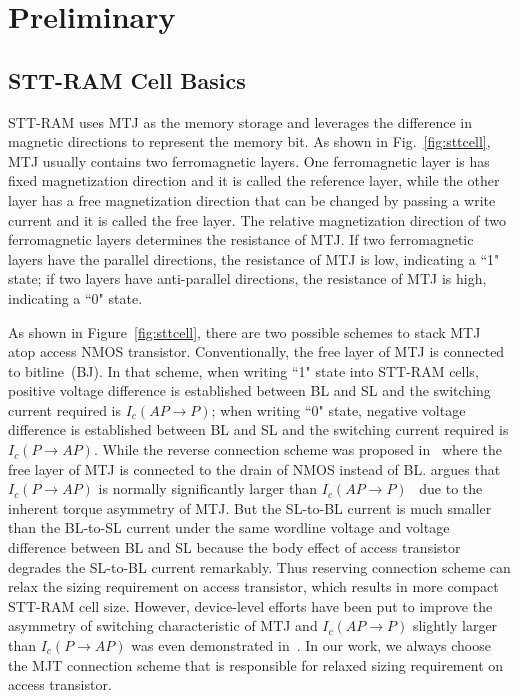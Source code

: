 \section{Preliminary} \label{sec:prelim}

\subsection{STT-RAM Cell Basics}
STT-RAM uses MTJ as the memory storage and leverages the difference in magnetic directions to represent the memory bit.  As shown in Fig.~\ref{fig:sttcell}, MTJ usually contains two ferromagnetic layers.  One ferromagnetic layer is has fixed magnetization direction and it is called the reference layer, while the other layer has a free magnetization direction that can be changed by passing a write current and it is called the free layer. The relative magnetization direction of two ferromagnetic layers determines the resistance of MTJ.  If two ferromagnetic layers have the parallel directions, the resistance of MTJ is low, indicating a ``1" state; if two layers have anti-parallel directions, the resistance of MTJ is high, indicating a ``0" state.

As shown in Figure~\ref{fig:sttcell}, there are two possible schemes to stack MTJ atop access NMOS transistor. Conventionally, the free layer of MTJ is connected to bitline~(BJ). In that scheme, when writing ``1" state into STT-RAM cells, positive voltage difference is established between BL and SL and the switching current required is $I_{c}(AP\rightarrow P)$; when writing ``0" state, negative voltage difference is established between BL and SL and the switching current required is $I_{c}(P\rightarrow AP)$. While the reverse connection scheme was proposed in~\cite{STTRAM:Qualcomm09} where the free layer of MTJ is connected to the drain of NMOS instead of BL. \cite{STTRAM:Qualcomm09} argues that $I_{c}(P\rightarrow AP)$ is normally significantly larger than $I_{c}(AP\rightarrow P)$~\cite{STTRAM:APL05,STTRAM:PRB05} due to the inherent torque asymmetry of MTJ. But the SL-to-BL current is much smaller than the BL-to-SL current under the same wordline voltage and voltage difference between BL and SL because the body effect of access transistor degrades the SL-to-BL current remarkably. Thus reserving connection scheme can relax the sizing requirement on access transistor, which results in more compact STT-RAM cell size. However, device-level efforts have been put to improve the asymmetry of switching characteristic of MTJ and $I_{c}(AP\rightarrow P)$ slightly larger than $I_{c}(P\rightarrow AP)$ was even demonstrated in~\cite{STTRAM:Grandis07}. In our work, we always choose the MJT connection scheme that is responsible for relaxed sizing requirement on access transistor.

